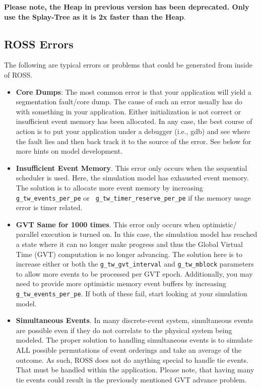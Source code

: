 \documentclass[12pt]{article}
\begin{document}
{\bf Please note, the Heap in previous version has been deprecated.
Only use the Splay-Tree as it is 2x faster than the Heap}.

\subsection{ROSS Errors}
The following are typical errors or problems that could be generated
from inside of ROSS.

\begin{itemize}
\item {\bf Core Dumps}: The most common error is that your application
will yield a segmentation fault/core dump. The cause of such an error
usually has do with something in your application. Either
initialization is not correct or insufficient event memory has been
allocated. In any case, the best course of action is to put your application
under a debugger (i.e., gdb) and see where the fault lies and then back
track it to the source of the error. See below for more hints on model
development.

\item {\bf Insufficient Event Memory}. This error only occurs when the
sequential scheduler is used. Here, the simulation model has exhausted
event memory. The solution is to allocate more event memory by
increasing {\tt g\_tw\_events\_per\_pe} or {\tt
g\_tw\_timer\_reserve\_per\_pe} if the memory usage error is timer
related. 

\item {\bf GVT Same for 1000 times}. This error only occurs when
optimistic/ parallel execution is turned on. In this case, the
simulation model has reached a state where it can no longer make
progress and thus the Global Virtual Time (GVT) computation is no
longer advancing. The solution here is to increase either or both the
{\tt g\_tw\_gvt\_interval} and {\tt g\_tw\_mblock} parameters to allow
more events to be processed per GVT epoch. Additionally, you may need
to provide more optimistic memory event buffers by increasing {\tt
g\_tw\_events\_per\_pe}. If both of these fail, start looking at
your simulation model.

\item {\bf Simultaneous Events}. In many discrete-event system,
simultaneous events are possible even if they do not correlate to the
physical system being modeled. The proper solution to handling
simultaneous events is to simulate ALL possible permutations of event
orderings and take an average of the outcome. As such, ROSS does not
do anything special to handle tie events. That must be handled within
the application. Please note, that having many tie events could result
in the previously mentioned GVT advance problem.
\end{itemize}
\end{document}

